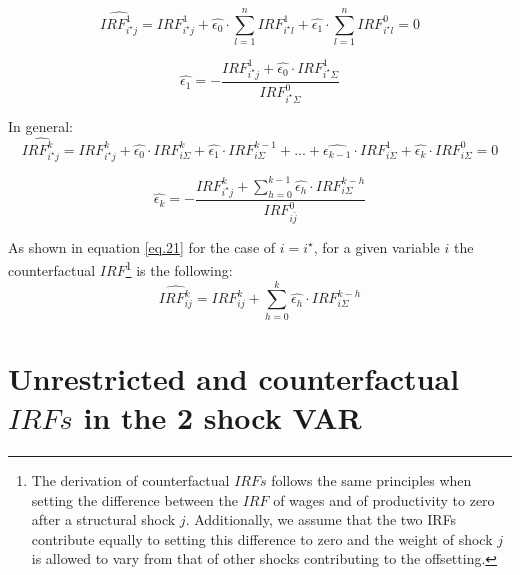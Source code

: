 \documentclass[11pt]{article}
\begin{document}
\begin{appendices}
\begin{equation}
\hat{IRF^1_{i^\star j}} = IRF^1_{i^\star j} + \hat{\epsilon_0} \cdot \sum_{l=1}^n IRF^1_{i^\star l} + \hat{\epsilon_1} \cdot \sum_{l=1}^n IRF^0_{i^\star l} = 0
\end{equation}

\begin{equation}
\hat{\epsilon_1}  = - \frac{IRF^1_{i^\star j}+ \hat{\epsilon_0} \cdot IRF^1_{i^\star \Sigma}}{IRF^0_{i^\star \Sigma}}
\end{equation}

In general:
\begin{equation}
\label{eq.21}
\hat{IRF^k_{i^\star j}} = IRF^k_{i^\star j} + \hat{\epsilon_0} \cdot IRF^k_{i \Sigma} + \hat{\epsilon_1} \cdot IRF^{k-1}_{i \Sigma} + ... +\hat{\epsilon_{k-1}} \cdot IRF^{1}_{i \Sigma} + \hat{\epsilon_k} \cdot IRF^{0}_{i \Sigma} = 0
\end{equation}

\begin{equation}
\hat{\epsilon_k}  = - \frac{IRF^k_{i^\star j}+ \sum_{h=0}^{k-1}\hat{\epsilon_h} \cdot IRF^{k-h}_{i\Sigma}}{IRF^0_{i\bar{j}}}
\end{equation}


As shown in equation \ref {eq.21} for the case of $i = i^\star$, for a given variable $i$ the counterfactual $IRF$\footnote{The derivation of counterfactual $IRFs$ follows the same principles when setting the difference between the $IRF$ of wages and of productivity to zero after a structural shock $j$. Additionally, we assume that the two IRFs contribute equally to setting this difference to zero and the weight of shock $j$  is allowed to vary from that of other shocks contributing to the offsetting.} is the following:
\begin{equation}
\hat{IRF^k_{ij}} = IRF^k_{ij} + \sum_{h=0}^{k} \hat{\epsilon_h} \cdot IRF^{k-h}_{i\Sigma}
\end{equation}

\clearpage


\section{Unrestricted and counterfactual $IRFs$ in the 2 shock VAR}
\label{AppendixSVAR2}


\end{appendices}
\end{document}
